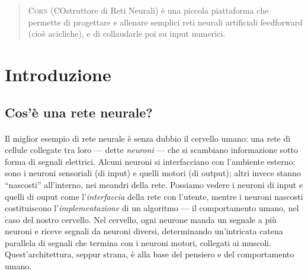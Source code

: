 \documentclass[12pt]{article}
\begin{document}
\maketitle




\begin{abstract}
\textsc{Corn} (COstruttore di Reti Neurali) è una piccola piattaforma che permette di progettare e allenare semplici reti neurali artificiali feedforward (cioè acicliche), e di collaudarle poi su input numerici.
\end{abstract}




\section{Introduzione}

\subsection{Cos'è una rete neurale?}

\paragraph{} Il miglior esempio di rete neurale è senza dubbio il cervello umano: una rete di cellule collegate tra loro --- dette \emph{neuroni} --- che si scambiano informazione sotto forma di segnali elettrici. Alcuni neuroni si interfacciano con l'ambiente esterno: sono i neuroni sensoriali (di input) e quelli motori (di output); altri invece stanno “nascosti” all'interno, nei meandri della rete. Possiamo vedere i neuroni di input e quelli di ouput come l'\textit{interfaccia} della rete con l'utente, mentre i neuroni nascosti costituiscono l'\textit{implementazione} di un algoritmo --- il comportamento umano, nel caso del nostro cervello. Nel cervello, ogni neurone manda un segnale a più neuroni e riceve segnali da neuroni diversi, determinando un'intricata catena parallela di segnali che termina con i neuroni motori, collegati ai muscoli. Quest'architettura, seppur strana, è alla base del pensiero e del comportamento umano.
\end{document}
